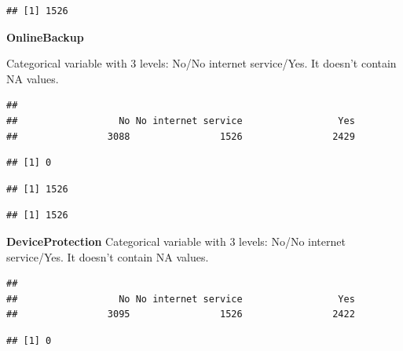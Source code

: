 \documentclass[
  twoside]{article}
\newenvironment{Shaded}{\begin{snugshade}}{\end{snugshade}}
\newcommand{\CommentTok}[1]{\textcolor[rgb]{0.56,0.35,0.01}{\textit{#1}}}
\newcommand{\FunctionTok}[1]{\textcolor[rgb]{0.13,0.29,0.53}{\textbf{#1}}}
\newcommand{\NormalTok}[1]{#1}
\newcommand{\SpecialCharTok}[1]{\textcolor[rgb]{0.81,0.36,0.00}{\textbf{#1}}}
\newcommand{\StringTok}[1]{\textcolor[rgb]{0.31,0.60,0.02}{#1}}
\begin{document}
\begin{verbatim}
## [1] 1526
\end{verbatim}

\textbf{OnlineBackup}

Categorical variable with 3 levels: No/No internet service/Yes. It
doesn't contain NA values.

\begin{verbatim}
## 
##                  No No internet service                 Yes 
##                3088                1526                2429
\end{verbatim}

\begin{verbatim}
## [1] 0
\end{verbatim}

\begin{Shaded}
\end{Shaded}

\begin{verbatim}
## [1] 1526
\end{verbatim}

\begin{Shaded}
\end{Shaded}

\begin{verbatim}
## [1] 1526
\end{verbatim}

\textbf{DeviceProtection} Categorical variable with 3 levels: No/No
internet service/Yes. It doesn't contain NA values.

\begin{verbatim}
## 
##                  No No internet service                 Yes 
##                3095                1526                2422
\end{verbatim}

\begin{verbatim}
## [1] 0
\end{verbatim}
\end{document}
